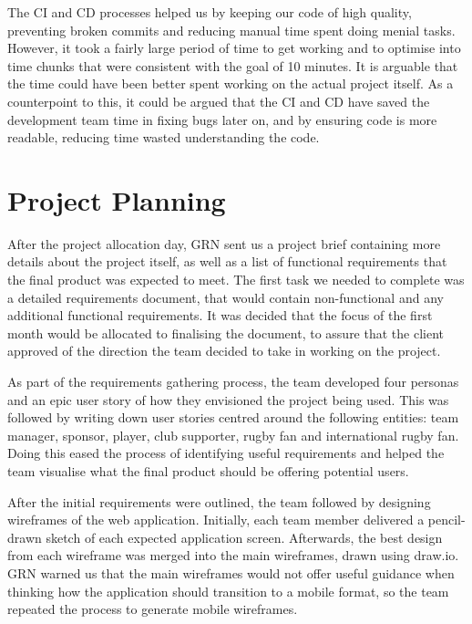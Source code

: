 \documentclass{l3proj}
\begin{document}
The CI and CD processes helped us by keeping our code of high quality, preventing broken commits and reducing
 manual time spent doing menial tasks. However, it took a fairly large period of time to get working and to
 optimise into time chunks that were consistent with the goal of 10 minutes. It is arguable that the time
 could have been better spent working on the actual project itself. As a counterpoint to this, it could be
 argued that the CI and CD have saved the development team time in fixing bugs later on, and by ensuring code is more
 readable, reducing time wasted understanding the code.

\section{Project Planning} %
\label{sec:planning}

After the project allocation day, GRN sent us a project brief containing
 more details about the project itself, as well as a list of functional
 requirements that the final product was expected to meet. The first
 task we needed to complete was a detailed requirements document, that would
 contain non-functional and any additional functional requirements. It was
 decided that the focus of the first month would be allocated to finalising
 the document, to assure that the client approved of the direction
 the team decided to take in working on the project.

As part of the requirements gathering process, the team developed four personas
 and an epic user story of how they envisioned the project being used. This was followed by
 writing down user stories centred around the following entities: team manager,
 sponsor, player, club supporter, rugby fan and international rugby fan. Doing
 this eased the process of identifying useful requirements and helped the team
 visualise what the final product should be offering potential users.

After the initial requirements were outlined, the team followed by designing
 wireframes of the web application. Initially, each team member delivered a
 pencil-drawn sketch of each expected application screen. Afterwards, the
 best design from each wireframe was merged into the main wireframes, drawn
 using draw.io. GRN warned us that the main wireframes would not offer useful
 guidance when thinking how the application should transition to a mobile format,
 so the team repeated the process to generate mobile wireframes.
\end{document}
